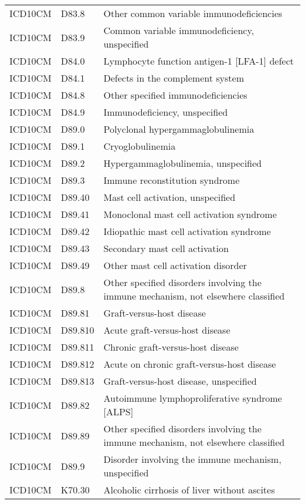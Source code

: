 \begin{longtable}{p{}p{}p{}}
  ICD10CM & D83.8 & Other common variable immunodeficiencies \\ 
  ICD10CM & D83.9 & Common variable immunodeficiency, unspecified \\ 
  ICD10CM & D84.0 & Lymphocyte function antigen-1 [LFA-1] defect \\ 
  ICD10CM & D84.1 & Defects in the complement system \\ 
  ICD10CM & D84.8 & Other specified immunodeficiencies \\ 
  ICD10CM & D84.9 & Immunodeficiency, unspecified \\ 
  ICD10CM & D89.0 & Polyclonal hypergammaglobulinemia \\ 
  ICD10CM & D89.1 & Cryoglobulinemia \\ 
  ICD10CM & D89.2 & Hypergammaglobulinemia, unspecified \\ 
  ICD10CM & D89.3 & Immune reconstitution syndrome \\ 
  ICD10CM & D89.40 & Mast cell activation, unspecified \\ 
  ICD10CM & D89.41 & Monoclonal mast cell activation syndrome \\ 
  ICD10CM & D89.42 & Idiopathic mast cell activation syndrome \\ 
  ICD10CM & D89.43 & Secondary mast cell activation \\ 
  ICD10CM & D89.49 & Other mast cell activation disorder \\ 
  ICD10CM & D89.8 & Other specified disorders involving the immune mechanism, not elsewhere classified \\ 
  ICD10CM & D89.81 & Graft-versus-host disease \\ 
  ICD10CM & D89.810 & Acute graft-versus-host disease \\ 
  ICD10CM & D89.811 & Chronic graft-versus-host disease \\ 
  ICD10CM & D89.812 & Acute on chronic graft-versus-host disease \\ 
  ICD10CM & D89.813 & Graft-versus-host disease, unspecified \\ 
  ICD10CM & D89.82 & Autoimmune lymphoproliferative syndrome [ALPS] \\ 
  ICD10CM & D89.89 & Other specified disorders involving the immune mechanism, not elsewhere classified \\ 
  ICD10CM & D89.9 & Disorder involving the immune mechanism, unspecified \\ 
  ICD10CM & K70.30 & Alcoholic cirrhosis of liver without ascites \\ 

\end{longtable}
